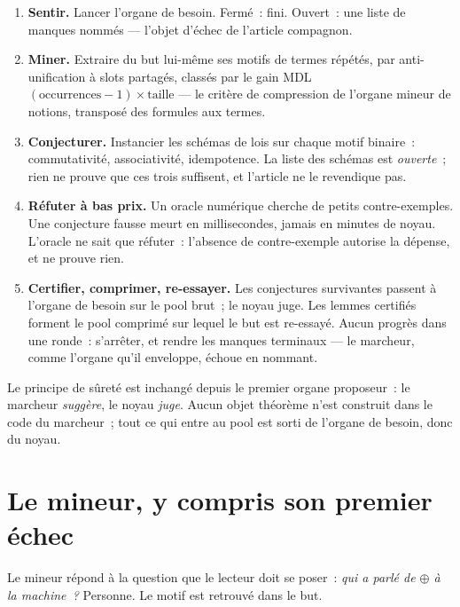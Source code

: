 \documentclass[11pt]{article}
\theoremstyle{remark}\newtheorem{remarque}{Remarque}
\begin{document}
\begin{enumerate}
\item \textbf{Sentir.} Lancer l'organe de besoin. Fermé~: fini. Ouvert~: une
  liste de manques nommés --- l'objet d'échec de l'article compagnon.
\item \textbf{Miner.} Extraire du but lui-même ses motifs de termes répétés,
  par anti-unification à slots partagés, classés par le gain MDL
  $(\mathrm{occurrences}-1) \times \mathrm{taille}$ --- le critère de
  compression de l'organe mineur de notions, transposé des formules aux
  termes.
\item \textbf{Conjecturer.} Instancier les schémas de lois sur chaque motif
  binaire~: commutativité, associativité, idempotence. La liste des schémas
  est \emph{ouverte}~; rien ne prouve que ces trois suffisent, et l'article
  ne le revendique pas.
\item \textbf{Réfuter à bas prix.} Un oracle numérique cherche de petits
  contre-exemples. Une conjecture fausse meurt en millisecondes, jamais en
  minutes de noyau. L'oracle ne sait que réfuter~: l'absence de
  contre-exemple autorise la dépense, et ne prouve rien.
\item \textbf{Certifier, comprimer, re-essayer.} Les conjectures survivantes
  passent à l'organe de besoin sur le pool brut~; le noyau juge. Les lemmes
  certifiés forment le pool comprimé sur lequel le but est re-essayé. Aucun
  progrès dans une ronde~: s'arrêter, et rendre les manques terminaux --- le
  marcheur, comme l'organe qu'il enveloppe, échoue en nommant.
\end{enumerate}

Le principe de sûreté est inchangé depuis le premier organe proposeur~: le
marcheur \emph{suggère}, le noyau \emph{juge}. Aucun objet théorème n'est
construit dans le code du marcheur~; tout ce qui entre au pool est sorti de
l'organe de besoin, donc du noyau.

\section{Le mineur, y compris son premier échec}
\label{sec:mineur}

Le mineur répond à la question que le lecteur doit se poser~: \emph{qui a
parlé de $\oplus$ à la machine~?} Personne. Le motif est retrouvé dans le
but.
\end{document}
